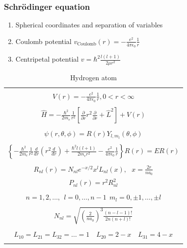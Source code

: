 \documentclass[11pt]{article}
\begin{document}
\subsubsection{Schr\"{o}dinger equation}
\label{sec:orgcead305}
\begin{enumerate}
\item Spherical coordinates and separation of variables
\item Coulomb potential \(v_\mathrm{Coulomb}(r)=-\frac{e^2}{4\pi\epsilon_0}\frac{1}{r}\)
\item Centripetal potential  \(v=\hbar^2\frac{l(l+1)}{2\mu r^2}\)
\end{enumerate}
\begin{table}[]
   \begin{center}
   \caption{Hydrogen atom}
    \label{Hydrogen atom}
\begin{tabular}[h]{|c|}
\hline
 \\
$\displaystyle       V(r) = -\frac{e^2}{4\pi\epsilon_0}\frac{1}{r}, 0 < r< \infty$ \\
 \\
$\displaystyle     \hat H = -\frac{\hbar^2}{2m_e}\frac{1}{r^2}\left [
  \frac{\partial}{\partial r}r^2\frac{\partial}{\partial r} + \hat L^2 \right ] +V(r)$ \\
\\
$\displaystyle \psi(r,\theta,\phi) = R(r)Y_{l,m_l}(\theta,\phi) $ \\
\\
$\displaystyle   \left \{ -\frac{\hbar^2}{2m_e}\frac{1}{r^2}
            \frac{d}{d r} \left ( r^2 \frac{d}{dr}\right ) + \frac{\hbar^2
              l(l+1)}{2 m_e r^2}
          -\frac{e^2}{4\pi\epsilon_0}\frac{1}{r}\right \} R(r) = E R(r) $ \\
\\
$\displaystyle R_{nl}(r) = N_{nl} e^{-x/2} x^l L_{nl}(x),\ \ \  x = \frac{2 r}{n a_0} $
\\
$\displaystyle P_{nl}(r) = r^2 R_{nl}^2 $
\\
\\
$\displaystyle n = 1, 2, \ldots,\ \  l = 0, \ldots, n-1 \ \ m_l = 0,\pm 1, \ldots, \pm l$
\\
\\
$\displaystyle N_{nl} = \sqrt{\left ( \frac{2}{na_0}\right )^3 \frac{(n-l-1)!}{2n(n+l)!}}$
\\
\\
$\displaystyle L_{10} = L_{21} = L_{32} = \ldots =1 \quad L_{20} = 2 - x \quad L_{31} = 4-x$
\\
\\

\end{tabular}
\end{center}
\end{table}
\end{document}
